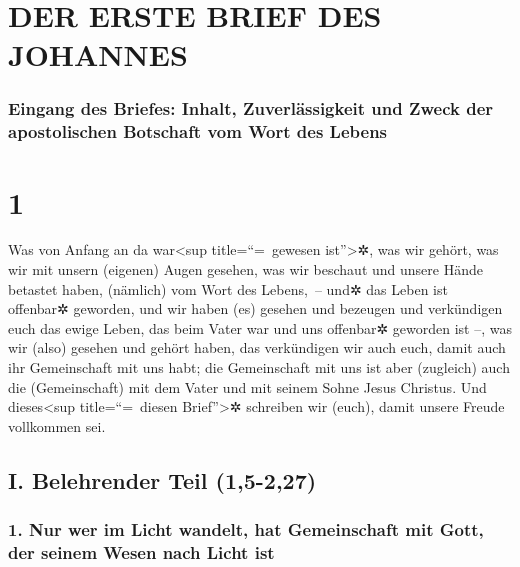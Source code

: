 \hypertarget{der-erste-brief-des-johannes}{%
\section{DER ERSTE BRIEF DES
JOHANNES}\label{der-erste-brief-des-johannes}}

\hypertarget{eingang-des-briefes-inhalt-zuverluxe4ssigkeit-und-zweck-der-apostolischen-botschaft-vom-wort-des-lebens}{%
\subsubsection{Eingang des Briefes: Inhalt, Zuverlässigkeit und Zweck
der apostolischen Botschaft vom Wort des
Lebens}\label{eingang-des-briefes-inhalt-zuverluxe4ssigkeit-und-zweck-der-apostolischen-botschaft-vom-wort-des-lebens}}

\hypertarget{section}{%
\section{1}\label{section}}

 Was von Anfang an da war\textless sup title=``=~gewesen
ist''\textgreater✲, was wir gehört, was wir mit unsern (eigenen) Augen
gesehen, was wir beschaut und unsere Hände betastet haben, (nämlich) vom
Wort des Lebens,~--  und✲ das Leben ist offenbar✲
geworden, und wir haben (es) gesehen und bezeugen und verkündigen euch
das ewige Leben, das beim Vater war und uns offenbar✲ geworden ist --,
 was wir (also) gesehen und gehört haben, das verkündigen
wir auch euch, damit auch ihr Gemeinschaft mit uns habt; die
Gemeinschaft mit uns ist aber (zugleich) auch die (Gemeinschaft) mit dem
Vater und mit seinem Sohne Jesus Christus.  Und
dieses\textless sup title=``=~diesen Brief''\textgreater✲ schreiben wir
(euch), damit unsere Freude vollkommen sei.

\hypertarget{i.-belehrender-teil-15-227}{%
\subsection{I. Belehrender Teil
(1,5-2,27)}\label{i.-belehrender-teil-15-227}}

\hypertarget{nur-wer-im-licht-wandelt-hat-gemeinschaft-mit-gott-der-seinem-wesen-nach-licht-ist}{%
\subsubsection{1. Nur wer im Licht wandelt, hat Gemeinschaft mit Gott,
der seinem Wesen nach Licht
ist}\label{nur-wer-im-licht-wandelt-hat-gemeinschaft-mit-gott-der-seinem-wesen-nach-licht-ist}}

